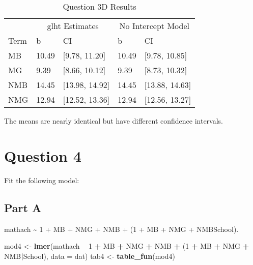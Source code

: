 \documentclass[]{article}
\newenvironment{Shaded}{\begin{snugshade}}{\end{snugshade}}
\newcommand{\KeywordTok}[1]{\textcolor[rgb]{0.13,0.29,0.53}{\textbf{#1}}}
\newcommand{\DataTypeTok}[1]{\textcolor[rgb]{0.13,0.29,0.53}{#1}}
\newcommand{\DecValTok}[1]{\textcolor[rgb]{0.00,0.00,0.81}{#1}}
\newcommand{\StringTok}[1]{\textcolor[rgb]{0.31,0.60,0.02}{#1}}
\newcommand{\OperatorTok}[1]{\textcolor[rgb]{0.81,0.36,0.00}{\textbf{#1}}}
\newcommand{\NormalTok}[1]{#1}
\begin{document}
\begin{table}

\caption{\label{tab:unnamed-chunk-12}Question 3D Results}
\centering
\begin{tabular}[t]{lllll}
\toprule
\multicolumn{1}{c}{ } & \multicolumn{2}{c}{glht Estimates} & \multicolumn{2}{c}{No Intercept Model} \\
\cmidrule(l{2pt}r{2pt}){2-3} \cmidrule(l{2pt}r{2pt}){4-5}
Term & b & CI & b & CI\\
\midrule
MB & 10.49 & [9.78, 11.20] & 10.49 & [9.78, 10.85]\\
MG & 9.39 & [8.66, 10.12] & 9.39 & [8.73, 10.32]\\
NMB & 14.45 & [13.98, 14.92] & 14.45 & [13.88, 14.63]\\
NMG & 12.94 & [12.52, 13.36] & 12.94 & [12.56, 13.27]\\
\bottomrule
\end{tabular}
\end{table}

The means are nearly identical but have different confidence intervals.

\section{Question 4}\label{question-4}

Fit the following model:

\subsection{Part A}\label{part-a-2}

mathach \textasciitilde{} 1 + MB + NMG + NMB + (1 + MB + NMG +
NMB\textbar{}School).

\begin{Shaded}
\begin{Highlighting}[]
\NormalTok{mod4 <-}\StringTok{ }\KeywordTok{lmer}\NormalTok{(mathach }\OperatorTok{~}\StringTok{ }\DecValTok{1} \OperatorTok{+}\StringTok{ }\NormalTok{MB }\OperatorTok{+}\StringTok{ }\NormalTok{NMG }\OperatorTok{+}\StringTok{ }\NormalTok{NMB }\OperatorTok{+}\StringTok{ }\NormalTok{(}\DecValTok{1} \OperatorTok{+}\StringTok{ }\NormalTok{MB }\OperatorTok{+}\StringTok{ }\NormalTok{NMG }\OperatorTok{+}\StringTok{ }\NormalTok{NMB}\OperatorTok{|}\NormalTok{School), }\DataTypeTok{data =}\NormalTok{ dat)}
\NormalTok{tab4 <-}\StringTok{ }\KeywordTok{table_fun}\NormalTok{(mod4)}
\end{Highlighting}
\end{Shaded}
\end{document}
